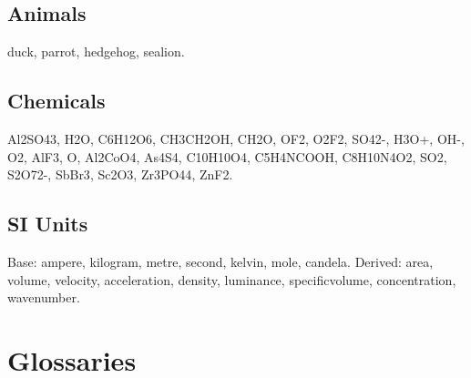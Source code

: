 \documentclass{scrreprt}
\begin{document}
\section{Animals}
\Gls{duck}, \gls{parrot}, \gls{hedgehog}, \gls{sealion}.

\section{Chemicals}
\gls{Al2SO43}, \gls{H2O}, \gls{C6H12O6},
\gls{CH3CH2OH}, \gls{CH2O}, \gls{OF2}, \gls{O2F2}, \gls{SO42-},
\gls{H3O+}, \gls{OH-}, \gls{O2}, \gls{AlF3}, \gls{O},
\gls{Al2CoO4}, \gls{As4S4}, \gls{C10H10O4}, \gls{C5H4NCOOH},
\gls{C8H10N4O2}, \gls{SO2}, \gls{S2O72-}, \gls{SbBr3},
\gls{Sc2O3}, \gls{Zr3PO44}, \gls{ZnF2}.

\section{SI Units}
Base: \gls{ampere}, \gls{kilogram}, \gls{metre}, \gls{second},
\gls{kelvin}, \gls{mole}, \gls{candela}.
Derived: \gls{area}, \gls{volume}, \gls{velocity},
\gls{acceleration}, \gls{density}, \gls{luminance},
\gls{specificvolume}, \gls{concentration}, \gls{wavenumber}.

\chapter*{Glossaries}
\renewcommand{\glsextrapostnamehook}[1]{\glsadd[format=hyperbf]{#1}}
\printunsrtglossary[type=bacteria,style=mcoltree]
\printunsrtglossary[type=markuplanguage,style=altlist]
\printunsrtglossary[type=vegetable,style=tree,nogroupskip]
\printunsrtglossary[type=mineral,style=treegroup]
\printunsrtglossary[type=animal,style=tree]
\printunsrtglossary[type=baseunit,style=alttree]
\printunsrtglossary[type=derivedunit,style=alttree]

\renewcommand{\glsextrapostnamehook}[1]{}
\printunsrtglossary[type=index,style=bookindex]
\end{document}
